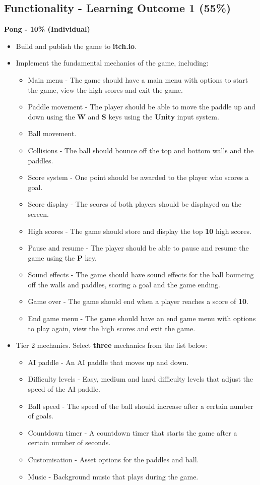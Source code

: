 \documentclass{article}
\begin{document}
\subsection*{Functionality - Learning Outcome 1 (55\%)}
\textbf{Pong - 10\% (Individual)}
\begin{itemize}
    \item Build and publish the game to \textbf{itch.io}.
	\item Implement the fundamental mechanics of the game, including:
	\begin{itemize}
        \item Main menu - The game should have a main menu with options to start the game, view the high scores and exit the game.
        \item Paddle movement - The player should be able to move the paddle up and down using the \textbf{W} and \textbf{S} keys using the \textbf{Unity} input system.
        \item Ball movement.
        \item Collisions - The ball should bounce off the top and bottom walls and the paddles.
        \item Score system - One point should be awarded to the player who scores a goal.
        \item Score display - The scores of both players should be displayed on the screen.
        \item High scores - The game should store and display the top \textbf{10} high scores.
        \item Pause and resume - The player should be able to pause and resume the game using the \textbf{P} key.
        \item Sound effects - The game should have sound effects for the ball bouncing off the walls and paddles, scoring a goal and the game ending.
        \item Game over - The game should end when a player reaches a score of \textbf{10}.
        \item End game menu - The game should have an end game menu with options to play again, view the high scores and exit the game.
    \end{itemize}
    
    \item Tier 2 mechanics. Select \textbf{three} mechanics from the list below:
    \begin{itemize}
        \item AI paddle - An AI paddle that moves up and down.
        \item Difficulty levels - Easy, medium and hard difficulty levels that adjust the speed of the AI paddle.
        \item Ball speed - The speed of the ball should increase after a certain number of goals.
        \item Countdown timer - A countdown timer that starts the game after a certain number of seconds.
        \item Customisation - Asset options for the paddles and ball.
        \item Music - Background music that plays during the game.
    \end{itemize}


\end{itemize}
\end{document}
